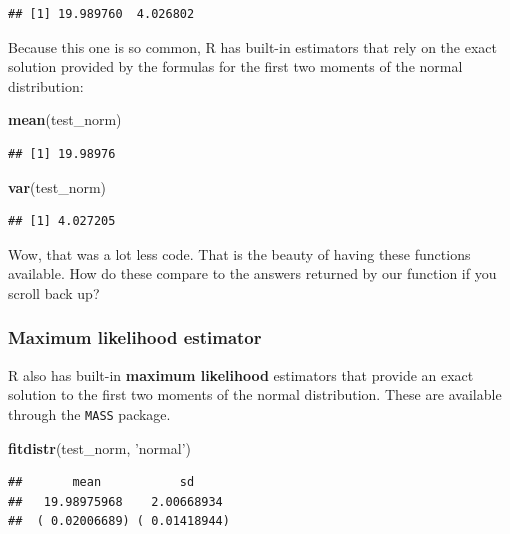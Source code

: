 \documentclass[
]{book}
\newenvironment{Shaded}{\begin{snugshade}}{\end{snugshade}}
\newcommand{\KeywordTok}[1]{\textcolor[rgb]{0.13,0.29,0.53}{\textbf{#1}}}
\newcommand{\NormalTok}[1]{#1}
\newcommand{\StringTok}[1]{\textcolor[rgb]{0.31,0.60,0.02}{#1}}
\begin{document}
\begin{verbatim}
## [1] 19.989760  4.026802
\end{verbatim}

Because this one is so common, R has built-in estimators that rely on
the exact solution provided by the formulas for the first two moments
of the normal distribution:

\begin{Shaded}
\begin{Highlighting}[]
\KeywordTok{mean}\NormalTok{(test_norm)}
\end{Highlighting}
\end{Shaded}

\begin{verbatim}
## [1] 19.98976
\end{verbatim}

\begin{Shaded}
\begin{Highlighting}[]
\KeywordTok{var}\NormalTok{(test_norm)}
\end{Highlighting}
\end{Shaded}

\begin{verbatim}
## [1] 4.027205
\end{verbatim}

Wow, that was a lot less code. That is the beauty of having these functions available. How do these compare to the answers returned by our function if you scroll back up?

\hypertarget{maximum-likelihood-estimator}{%
\subsubsection{Maximum likelihood estimator}\label{maximum-likelihood-estimator}}

R also has built-in \textbf{maximum likelihood} estimators that provide an exact solution to the first two moments of the normal distribution. These are available through the \texttt{MASS} package.

\begin{Shaded}
\begin{Highlighting}[]
\KeywordTok{fitdistr}\NormalTok{(test_norm, }\StringTok{'normal'}\NormalTok{)}
\end{Highlighting}
\end{Shaded}

\begin{verbatim}
##       mean           sd     
##   19.98975968    2.00668934 
##  ( 0.02006689) ( 0.01418944)
\end{verbatim}
\end{document}
